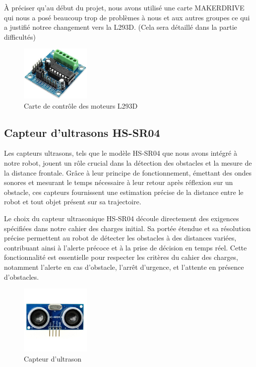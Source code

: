 À préciser qu'au début du projet, nous avons utilisé une carte MAKERDRIVE qui nous a posé beaucoup trop de problèmes à nous et aux autres groupes ce qui a justifié notree changement vers la L293D. (Cela sera détaillé dans la partie difficultés)

\begin{figure}[h]
    \centering
    \includegraphics[width=0.3\textwidth]{images/components/L293D.jpg}
    \caption{Carte de contrôle des moteurs L293D}
    \label{fig:L293D}
\end{figure}

\subsection{Capteur d'ultrasons HS-SR04}
Les capteurs ultrasons, tels que le modèle HS-SR04 que nous avons intégré à notre robot, jouent un rôle crucial dans la détection des obstacles et la mesure de la distance frontale. Grâce à leur principe de fonctionnement, émettant des ondes sonores et mesurant le temps nécessaire à leur retour après réflexion sur un obstacle, ces capteurs fournissent une estimation précise de la distance entre le robot et tout objet présent sur sa trajectoire.

Le choix du capteur ultrasonique HS-SR04 découle directement des exigences spécifiées dans notre cahier des charges initial. Sa portée étendue et sa résolution précise permettent au robot de détecter les obstacles à des distances variées, contribuant ainsi à l'alerte précoce et à la prise de décision en temps réel. Cette fonctionnalité est essentielle pour respecter les critères du cahier des charges, notamment l'alerte en cas d'obstacle, l'arrêt d'urgence, et l'attente en présence d'obstacles.

\begin{figure}[h]
    \centering
    \includegraphics[width=0.3\textwidth]{images/components/capteur_ultrason.jpg}
    \caption{Capteur d'ultrason}
    \label{fig:HS-SR04}
\end{figure}

